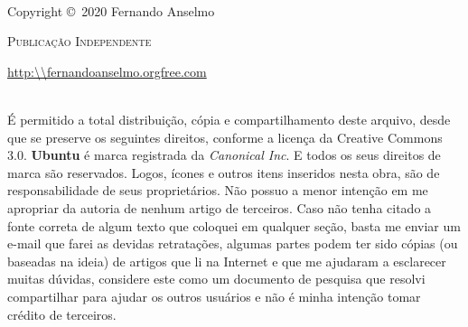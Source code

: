 \documentclass[a4paper,11pt]{book} %
\begin{document}
\begingroup
\thispagestyle{empty}
\vfill
\endgroup

\newpage
~\vfill
\thispagestyle{empty}

\noindent Copyright \copyright\ 2020 Fernando Anselmo%

\noindent \textsc{Publicação Independente} %

\noindent \url{http:\\fernandoanselmo.orgfree.com} %

\noindent \\ É permitido a total distribuição, cópia e compartilhamento deste arquivo, desde que se preserve os seguintes direitos, conforme a licença da Creative Commons 3.0. \textbf{Ubuntu} é marca registrada da \textit{Canonical Inc}. E todos os seus direitos de marca são reservados. Logos, ícones e outros itens inseridos nesta obra, são de responsabilidade de seus proprietários. Não possuo a menor intenção em me apropriar da autoria de nenhum artigo de terceiros. Caso não tenha citado a fonte correta de algum texto que coloquei em qualquer seção, basta me enviar um e-mail que farei as devidas retratações, algumas partes podem ter sido cópias (ou baseadas na ideia) de artigos que li na Internet e que me ajudaram a esclarecer muitas dúvidas, considere este como um documento de pesquisa que resolvi compartilhar para ajudar os outros usuários e não é minha intenção tomar crédito de terceiros. %

\end{document}
